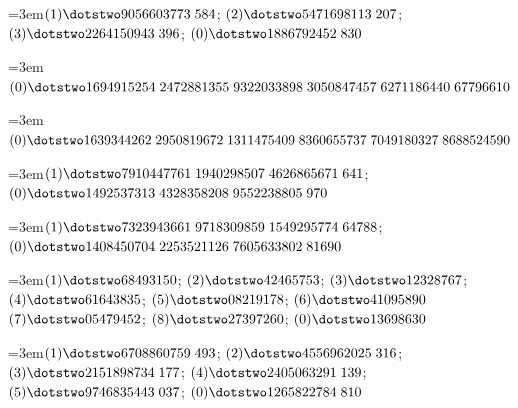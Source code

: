 \par\noindent\hangindent=3em\enspace $(1)\dotstwo9056603773\;\allowbreak 584$; $(2)\dotstwo5471698113\;\allowbreak 207$; $(3)\dotstwo2264150943\;\allowbreak 396$; $(0)\dotstwo1886792452\;\allowbreak 830$\par\smallskip

\par\noindent\hangindent=3em\enspace $(0)\dotstwo1694915254\;\allowbreak 2472881355\;\allowbreak 9322033898\;\allowbreak 3050847457\;\allowbreak 6271186440\;\allowbreak 67796610$\par\smallskip

\par\noindent\hangindent=3em\enspace $(0)\dotstwo1639344262\;\allowbreak 2950819672\;\allowbreak 1311475409\;\allowbreak 8360655737\;\allowbreak 7049180327\;\allowbreak 8688524590$\par\smallskip

\par\noindent\hangindent=3em\enspace $(1)\dotstwo7910447761\;\allowbreak 1940298507\;\allowbreak 4626865671\;\allowbreak 641$; $(0)\dotstwo1492537313\;\allowbreak 4328358208\;\allowbreak 9552238805\;\allowbreak 970$\par\smallskip

\par\noindent\hangindent=3em\enspace $(1)\dotstwo7323943661\;\allowbreak 9718309859\;\allowbreak 1549295774\;\allowbreak 64788$; $(0)\dotstwo1408450704\;\allowbreak 2253521126\;\allowbreak 7605633802\;\allowbreak 81690$\par\smallskip

\par\noindent\hangindent=3em\enspace $(1)\dotstwo68493150$; $(2)\dotstwo42465753$; $(3)\dotstwo12328767$; $(4)\dotstwo61643835$; $(5)\dotstwo08219178$; $(6)\dotstwo41095890$ $(7)\dotstwo05479452$; $(8)\dotstwo27397260$; $(0)\dotstwo13698630$\par\smallskip

\par\noindent\hangindent=3em\enspace $(1)\dotstwo6708860759\;\allowbreak 493$; $(2)\dotstwo4556962025\;\allowbreak 316$; $(3)\dotstwo2151898734\;\allowbreak 177$; $(4)\dotstwo2405063291\;\allowbreak 139$; $(5)\dotstwo9746835443\;\allowbreak 037$; $(0)\dotstwo1265822784\;\allowbreak 810$\par\smallskip

